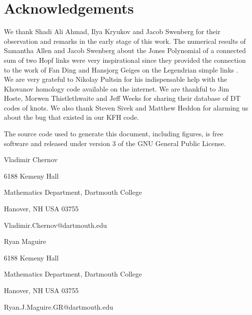 \documentclass{article}
\theoremstyle{plain}
\begin{document}
    \section{Acknowledgements}
        We thank Shadi Ali Ahmad, Ilya Kryukov and Jacob Swenberg for their
        observation and remarks in the early stage of this work. The numerical
        results of Samantha Allen and Jacob Swenberg about the Jones Polynomial
        of a connected sum of two Hopf links were very inspirational since they
        provided the connection to the work of Fan Ding and Hansjorg Geiges on
        the Legendrian simple links . We are very grateful to Nikolay Pultsin
        for his indispensable help with the Khovanov homology code available
        on the internet. We are thankful to Jim Hoste, Morwen Thistlethwaite
        and Jeff Weeks for sharing their database of DT codes of knots.
        We also thank Steven Sivek and Matthew Heddon
        for alarming us about the bug that
        existed in our KFH code.
    \newpage
    
    
    \newpage
    The source code used to generate this document, including figures,
    is free software and released under version 3 of the GNU General Public
    License.
    \par\hfill\par
    Vladimir Chernov
    \par
    6188 Kemeny Hall
    \par
    Mathematics Department, Dartmouth College
    \par
    Hanover, NH USA 03755
    \par
    Vladimir.Chernov@dartmouth.edu
    \par\hfill\par
    Ryan Maguire
    \par
    6188 Kemeny Hall
    \par
    Mathematics Department, Dartmouth College
    \par
    Hanover, NH USA 03755
    \par
    Ryan.J.Maguire.GR@dartmouth.edu
\end{document}
